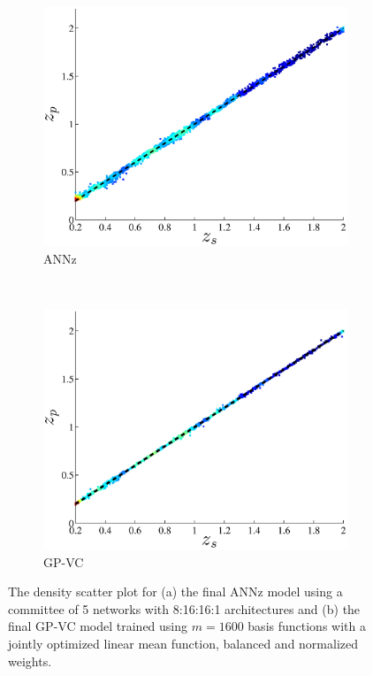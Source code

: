 \documentclass[useAMS,usenatbib,fleqn]{mn2e}
\begin{document}
\begin{figure}
        \centering
       
       \begin{subfigure}[b]{\columnwidth}
                \includegraphics[width=\columnwidth]{figures/ANN_final.eps}
        \caption{ANNz}
        \end{subfigure}
        ~ 
        \begin{subfigure}[b]{\columnwidth}
                \includegraphics[width=\columnwidth]{figures/final-1600.eps}
        \caption{GP-VC}
        \end{subfigure}

       \caption{The density scatter plot for (a) the final ANNz model using a committee of 5 networks with 8:16:16:1 architectures and (b) the final GP-VC model trained using $m=1600$ basis functions with a jointly optimized linear mean function, balanced and normalized weights. }
       \label{fig-final-model}
\end{figure}
\end{document}
